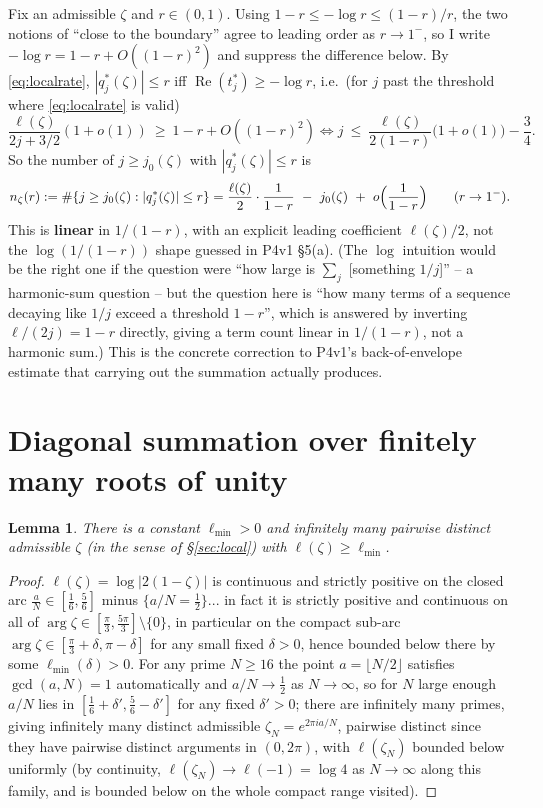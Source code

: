\documentclass[11pt]{article}
\newtheorem{lemma}[theorem]{Lemma}
\theoremstyle{remark}
\begin{document}
Fix an admissible $\zeta$ and $r\in(0,1)$. Using $1-r\le-\log r\le(1-r)/r$, the two notions of
``close to the boundary'' agree to leading order as $r\to1^-$, so I write $-\log r=1-r+O((1-r)^2)$ and
suppress the difference below. By \eqref{eq:localrate}, $|q^\ast_j(\zeta)|\le r$ iff
$\operatorname{Re}(t^\ast_j)\ge-\log r$, i.e.\ (for $j$ past the threshold where \eqref{eq:localrate}
is valid)
\[
   \frac{\ell(\zeta)}{2j+3/2}(1+o(1))\ \ge\ 1-r+O((1-r)^2)
   \iff j\ \le\ \frac{\ell(\zeta)}{2(1-r)}\bigl(1+o(1)\bigr)-\frac34.
\]
So the number of $j\ge j_0(\zeta)$ with $|q^\ast_j(\zeta)|\le r$ is
\begin{equation}\label{eq:percount}
   n_\zeta(r):=\#\{j\ge j_0(\zeta):|q^\ast_j(\zeta)|\le r\}
   =\frac{\ell(\zeta)}{2}\cdot\frac1{1-r}\ -\ j_0(\zeta)\ +\ o\Bigl(\frac1{1-r}\Bigr)\qquad(r\to1^-).
\end{equation}
This is \textbf{linear} in $1/(1-r)$, with an explicit leading coefficient $\ell(\zeta)/2$, not the
$\log(1/(1-r))$ shape guessed in P4v1 \S5(a). (The $\log$ intuition would be the right one if the
question were ``how large is $\sum_j$ [something $1/j$]'' -- a harmonic-sum question -- but the
question here is ``how many terms of a sequence decaying like $1/j$ exceed a threshold $1-r$'', which
is answered by inverting $\ell/(2j)=1-r$ directly, giving a term count linear in $1/(1-r)$, not a
harmonic sum.) This is the concrete correction to P4v1's back-of-envelope estimate that carrying out
the summation actually produces.

\section{Diagonal summation over finitely many roots of unity}\label{sec:diagonal}

\begin{lemma}\label{lem:many}
There is a constant $\ell_{\min}>0$ and infinitely many pairwise distinct admissible $\zeta$ (in the
sense of \S\ref{sec:local}) with $\ell(\zeta)\ge\ell_{\min}$.
\end{lemma}
\begin{proof}
$\ell(\zeta)=\log|2(1-\zeta)|$ is continuous and strictly positive on the closed arc
$\frac aN\in[\frac16,\frac56]$ minus $\{a/N=\frac12\}$... in fact it is strictly positive and
continuous on all of $\arg\zeta\in[\frac\pi3,\frac{5\pi}3]\setminus\{0\}$, in particular on the
compact sub-arc $\arg\zeta\in[\frac\pi3+\delta,\pi-\delta]$ for any small fixed $\delta>0$, hence
bounded below there by some $\ell_{\min}(\delta)>0$. For any prime $N\ge16$ the point $a=\lfloor
N/2\rfloor$ satisfies $\gcd(a,N)=1$ automatically and $a/N\to\frac12$ as $N\to\infty$, so for $N$
large enough $a/N$ lies in $[\frac16+\delta',\frac56-\delta']$ for any fixed $\delta'>0$; there are
infinitely many primes, giving infinitely many distinct admissible $\zeta_N=e^{2\pi ia/N}$, pairwise
distinct since they have pairwise distinct arguments in $(0,2\pi)$, with $\ell(\zeta_N)$ bounded below
uniformly (by continuity, $\ell(\zeta_N)\to\ell(-1)=\log4$ as $N\to\infty$ along this family, and is
bounded below on the whole compact range visited).
\end{proof}
\end{document}
